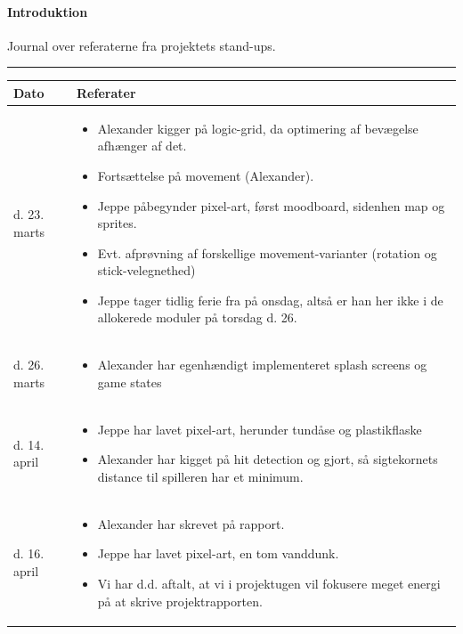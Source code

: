 \paragraph{Introduktion} Journal over referaterne fra projektets stand-ups.\\
\hrule
\begin{table}[H]
  \centering
\begin{tabular}{l p{10cm}} \toprule
  Dato & Referater \\ \midrule
  d. 23. marts &
    \begin{itemize}
    \item Alexander kigger på logic-grid, da optimering af bevægelse afhænger af det.
    \item Fortsættelse på movement (Alexander).
    \item Jeppe påbegynder pixel-art, først moodboard, sidenhen map og sprites.
    \item Evt. afprøvning af forskellige movement-varianter (rotation og stick-velegnethed)
    \item Jeppe tager tidlig ferie fra på onsdag, altså er han her ikke i de allokerede moduler på torsdag d. 26.
    \end{itemize} \\ \midrule
  d. 26. marts &
    \begin{itemize}
    \item Alexander har egenhændigt implementeret splash screens og game states
    \end{itemize} \\ \midrule
  d. 14. april &
    \begin{itemize}
      \item Jeppe har lavet pixel-art, herunder tundåse og plastikflaske
     \item Alexander har kigget på hit detection og gjort, så sigtekornets distance til spilleren har et minimum.
    \end{itemize} \\ \midrule
  d. 16. april &
    \begin{itemize}
    \item Alexander har skrevet på rapport.
    \item Jeppe har lavet pixel-art, en tom vanddunk.
    \item Vi har d.d. aftalt, at vi i projektugen vil fokusere meget energi på at skrive projektrapporten.
    \end{itemize} \\ \bottomrule
\end{tabular}
\end{table}

